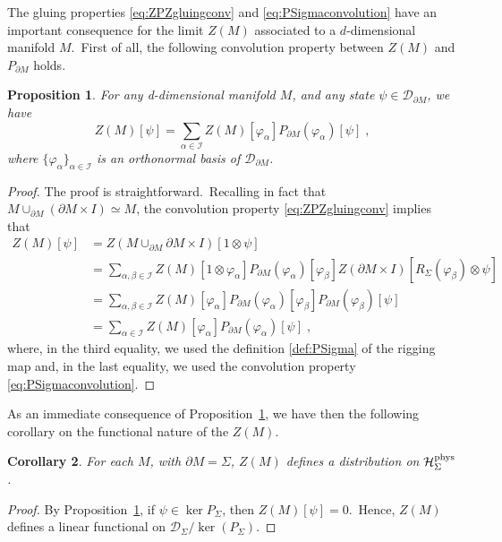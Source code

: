 \documentclass[11pt]{article}
\newcommand{\cD}{\mathcal{D}}
\newcommand{\Hphys}{\mathcal{H}_{\Sigma}^{\rm phys}}
\newcommand{\del}{\partial}
\newtheorem{proposition}{Proposition}[section]
\newtheorem{corollary}[proposition]{Corollary}
\theoremstyle{definition}
\numberwithin{equation}{section}
\begin{document}
The gluing properties \eqref{eq:ZPZgluingconv} and \eqref{eq:PSigmaconvolution} have an important consequence for the limit $Z(M)$ associated to a $d$-dimensional manifold $M$.~First of all, the following convolution property between $Z(M)$ and $P_{\del M}$ holds.
\begin{proposition}\label{prop:ZconvP}
    For any d-dimensional manifold $M$, and any state $\psi\in\mathcal D_{\del M}$, we have
 \begin{equation}
     Z(M)[\psi]=\sum_{\alpha\in\mathscr I}Z(M)[\varphi_\alpha]P_{\del M}(\varphi_\alpha)[\psi]\;,
 \end{equation}
 where $\{\varphi_\alpha\}_{\alpha\in\mathscr I}$ is an orthonormal basis of $\mathcal{D}_{\del M}$.
\end{proposition}
\begin{proof}
    The proof is straightforward.~Recalling in fact that $M\cup_{\partial M}(\partial M\times I)\simeq M$, the convolution property \eqref{eq:ZPZgluingconv} implies that
    \begin{align*}
        Z(M)[\psi]&=Z(M\cup_{\partial M}\partial M\times I)[1\otimes\psi]\\
        &=\sum_{\alpha,\beta\in\mathscr I}Z(M)[1\otimes \varphi_\alpha]P_{\partial M}(\varphi_\alpha)[\varphi_\beta]Z(\partial M\times I)[R_\Sigma(\varphi_\beta)\otimes\psi]\\
        &=\sum_{\alpha,\beta\in\mathscr I}Z(M)[\varphi_\alpha]P_{\partial M}(\varphi_\alpha)[\varphi_\beta]P_{\partial M}(\varphi_\beta)[\psi]\\
        &=\sum_{\alpha\in\mathscr I}Z(M)[\varphi_\alpha]P_{\partial M}(\varphi_\alpha)[\psi]\;,
    \end{align*}
    where, in the third equality, we used the definition \eqref{def:PSigma} of the rigging map and, in the last equality, we used the convolution property \eqref{eq:PSigmaconvolution}.
\end{proof}
\noindent
As an immediate consequence of Proposition~\ref{prop:ZconvP}, we have then the following corollary on the functional nature of the $Z(M)$.
\begin{corollary}\label{cor:ZMdistrib}
    For each $M$, with $\partial M=\Sigma$, $Z(M)$ defines a distribution on $\Hphys$.
\end{corollary}
\begin{proof}
    By Proposition~\ref{prop:ZconvP}, if $\psi\in\ker P_{\Sigma}$, then $Z(M)[\psi]=0$.~Hence, $Z(M)$ defines a linear functional on $\cD_{\Sigma}/\ker(P_{\Sigma})$.
\end{proof}
\end{document}
